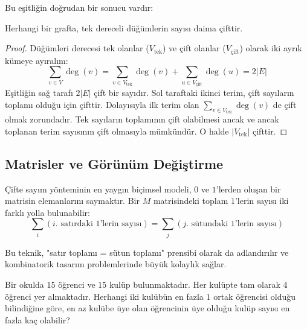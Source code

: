 Bu eşitliğin doğrudan bir sonucu vardır:

\begin{theorem}
Herhangi bir grafta, tek dereceli düğümlerin sayısı daima çifttir.
\end{theorem}

\begin{proof}
Düğümleri derecesi tek olanlar ($V_{\text{tek}}$) ve çift olanlar ($V_{\text{çift}}$) olarak iki ayrık kümeye ayıralım:
\[ \sum_{v \in V} \deg(v) = \sum_{v \in V_{\text{tek}}} \deg(v) + \sum_{u \in V_{\text{çift}}} \deg(u) = 2|E| \]
Eşitliğin sağ tarafı $2|E|$ çift bir sayıdır. Sol taraftaki ikinci terim, çift sayıların toplamı olduğu için çifttir. Dolayısıyla ilk terim olan $\sum_{v \in V_{\text{tek}}} \deg(v)$ de çift olmak zorundadır. Tek sayıların toplamının çift olabilmesi ancak ve ancak toplanan terim sayısının çift olmasıyla mümkündür. O halde $|V_{\text{tek}}|$ çifttir.
\end{proof}

\subsection{Matrisler ve Görünüm Değiştirme}

Çifte sayım yönteminin en yaygın biçimsel modeli, $0$ ve $1$'lerden oluşan bir matrisin elemanlarını saymaktır. Bir $M$ matrisindeki toplam $1$'lerin sayısı iki farklı yolla bulunabilir:
\[ \sum_{i} (\text{$i$. satırdaki 1'lerin sayısı}) = \sum_{j} (\text{$j$. sütundaki 1'lerin sayısı}) \]

Bu teknik, "satır toplamı = sütun toplamı" prensibi olarak da adlandırılır ve kombinatorik tasarım problemlerinde büyük kolaylık sağlar.

\begin{example}
Bir okulda $15$ öğrenci ve $15$ kulüp bulunmaktadır. Her kulüpte tam olarak $4$ öğrenci yer almaktadır. Herhangi iki kulübün en fazla $1$ ortak öğrencisi olduğu bilindiğine göre, en az kulübe üye olan öğrencinin üye olduğu kulüp sayısı en fazla kaç olabilir?
\end{example}

